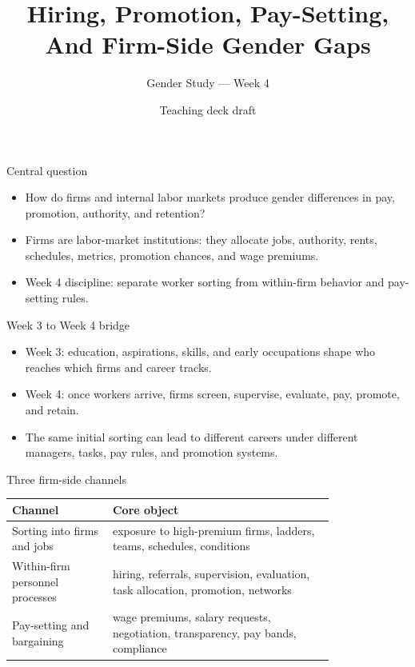 \documentclass[aspectratio=169,11pt]{beamer}
\title{Hiring, Promotion, Pay-Setting, And Firm-Side Gender Gaps}
\subtitle{Gender Study --- Week 4}
\author{Teaching deck draft}
\date{}
\begin{document}
\begin{frame}
  \titlepage
\end{frame}

\begin{frame}{Central question}
\begin{itemize}
    \item How do firms and internal labor markets produce gender differences in pay, promotion, authority, and retention?
    \item Firms are labor-market institutions: they allocate jobs, authority, rents, schedules, metrics, promotion chances, and wage premiums.
    \item Week 4 discipline: separate worker sorting from within-firm behavior and pay-setting rules.
\end{itemize}
\end{frame}

\begin{frame}{Week 3 to Week 4 bridge}
\begin{itemize}
    \item Week 3: education, aspirations, skills, and early occupations shape who reaches which firms and career tracks.
    \item Week 4: once workers arrive, firms screen, supervise, evaluate, pay, promote, and retain.
    \item The same initial sorting can lead to different careers under different managers, tasks, pay rules, and promotion systems.
\end{itemize}
\end{frame}

\begin{frame}{Three firm-side channels}
\small
\begin{tabular}{p{0.25\linewidth} p{0.55\linewidth}}
\toprule
Channel & Core object \\
\midrule
Sorting into firms and jobs & exposure to high-premium firms, ladders, teams, schedules, conditions \\
Within-firm personnel processes & hiring, referrals, supervision, evaluation, task allocation, promotion, networks \\
Pay-setting and bargaining & wage premiums, salary requests, negotiation, transparency, pay bands, compliance \\
\bottomrule
\end{tabular}
\end{frame}
\end{document}
